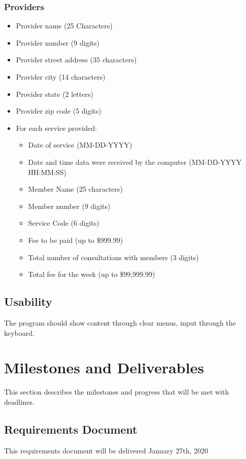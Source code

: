 \documentclass{article}
\begin{document}
\subsubsection{Providers}
\begin{itemize}
\item Provider name (25 Characters)
\item Provider number (9 digits)
\item Provider street address (35  characters)
\item Provider city (14 characters)
\item Provider state (2 letters)
\item Provider zip code (5 digits)
\item For each service provided:
\begin{itemize}
\item Date of service (MM-DD-YYYY)
\item Date and time data were received by the computer (MM-DD-YYYY HH:MM:SS)
\item Member Name (25 characters)
\item Member number (9 digits)
\item Service Code (6 digits)
\item Fee to be paid (up to \$999.99)
\item Total number of consultations with members (3 digits)
\item Total fee for the week (up to \$99,999.99)
\end{itemize}
\end{itemize}

\subsection{Usability}
The program should show content through clear menus, input through the keyboard.




\section{Milestones and Deliverables}
This section describes the milestones and progress that will be met with deadlines.


\subsection{Requirements Document}
This requirements document will be delivered January 27th, 2020
\end{document}

